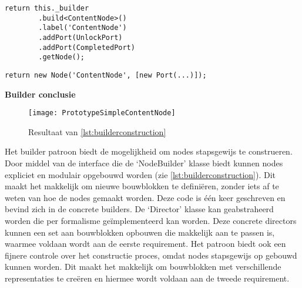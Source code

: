 \lstset{language=JavaScript}
\begin{lstlisting}[caption={Constructie stap voor stap door de 'Director', geschreven in TypeScript.},captionpos=b,label={lst:builderconstruction}]
    return this._builder
        .build<ContentNode>()
        .label('ContentNode')
        .addPort(UnlockPort)
        .addPort(CompletedPort)
        .getNode();
\end{lstlisting}

\lstset{language=JavaScript}
\begin{lstlisting}[caption={Directe instantiatie door constructor.},captionpos=b,label={lst:constructionbyconstructor}]
    return new Node('ContentNode', [new Port(...)]);
\end{lstlisting}

\noindent\textbf{Builder conclusie}\\
\begin{wrapfigure}{r}{0.4\textwidth}
    \centering    
    \texttt{[image: PrototypeSimpleContentNode]}
    \caption{Resultaat van \autoref{lst:builderconstruction}}
\end{wrapfigure}
Het builder patroon biedt de mogelijkheid om nodes stapsgewijs te construeren. Door middel van de interface die de ‘NodeBuilder’ klasse biedt kunnen nodes expliciet en modulair opgebouwd worden (zie \autoref{lst:builderconstruction}). Dit maakt het makkelijk om nieuwe bouwblokken te definiëren, zonder iets af te weten van hoe de nodes gemaakt worden. Deze code is één keer geschreven en bevind zich in de concrete builders. De ‘Director’ klasse kan geabstraheerd worden die per formalisme geïmplementeerd kan worden. Deze concrete directors kunnen een set aan bouwblokken opbouwen die makkelijk aan te passen is, waarmee voldaan wordt aan de eerste requirement. Het patroon biedt ook een fijnere controle over het constructie proces, omdat nodes stapsgewijs op gebouwd kunnen worden. Dit maakt het makkelijk om bouwblokken met verschillende representaties te creëren en hiermee wordt voldaan aan de tweede requirement.

               
